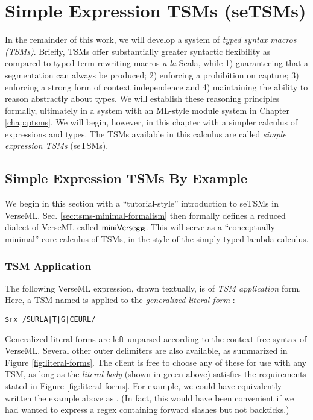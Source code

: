 \chapter{Simple Expression TSMs (seTSMs)}\label{chap:uetsms}
In the remainder of this work, we will develop a system of \emph{typed syntax macros (TSMs)}. Briefly, TSMs offer substantially greater syntactic flexibility as compared to typed term rewriting macros \emph{a la} Scala, while 1) guaranteeing that a segmentation can always be produced; 2) enforcing a prohibition on capture; 3) enforcing a strong form of context independence and 4) maintaining the ability to reason abstractly about types. We will establish these reasoning principles formally, ultimately in a system with an ML-style module system in Chapter \ref{chap:ptsms}. We will begin, however, in this chapter with a simpler calculus of expressions and types. The TSMs available in this calculus are called \emph{simple expression TSMs} (seTSMs).

\section{Simple Expression TSMs By Example}\label{sec:tsms-by-example}
We begin in this section with a ``tutorial-style'' introduction to seTSMs in VerseML. %
Sec. \ref{sec:tsms-minimal-formalism} then formally defines a reduced dialect of VerseML called $\mathsf{miniVerse}_\textbf{SE}$. This will serve as a ``conceptually minimal'' core calculus of TSMs, in the style of the simply typed lambda calculus.   %


\subsection{TSM Application}\label{sec:uetsms-usage}
The following VerseML expression, drawn textually, is of \emph{TSM application} form. Here, a TSM named  is applied to the \emph{generalized literal form} :
\begin{lstlisting}[numbers=none,mathescape=|]
$rx /SURLA|T|G|CEURL/
\end{lstlisting}
Generalized literal forms are left unparsed according to the context-free syntax of VerseML. Several other outer delimiters are also available, as summarized in Figure \ref{fig:literal-forms}. The client is free to choose any of these for use with any TSM, as long as the \emph{literal body} (shown in green above) satisfies the requirements stated in Figure \ref{fig:literal-forms}. For example, we could have equivalently written the example above as . (In fact, this would have been convenient if we had wanted to express a regex containing forward slashes but not backticks.) 

